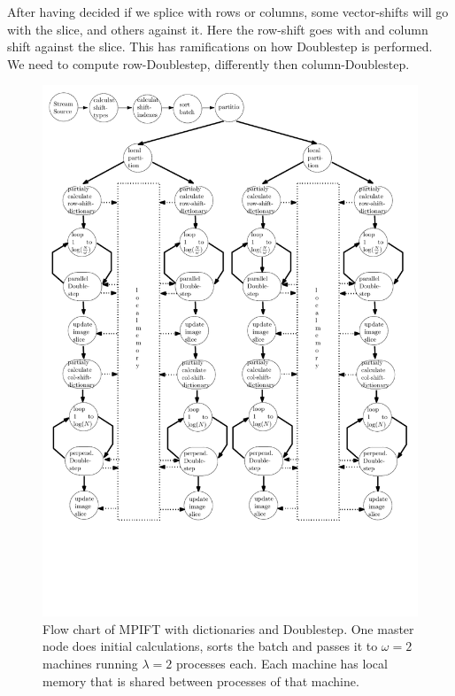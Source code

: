 \documentclass[12pt]{article}
\begin{document}
After having decided if we splice with rows or columns, some vector-shifts will go with the slice, and others against it. Here the row-shift goes with and column shift against the slice. This has ramifications on how Doublestep is performed. We need to compute row-Doublestep, differently then column-Doublestep. \\

\begin{figure}[H]
	\begin{center}
	\includegraphics[width=370pt]{DOUBLESTEP_plan}
\end{center}
	\caption{Flow chart of MPIFT with dictionaries and Doublestep. One master node does initial calculations, sorts the batch and passes it to $\omega=2$ machines running $\lambda=2$ processes each. Each machine has local memory that is shared between processes of that machine.}
	\label{fig::doublestep_plan}
\end{figure}
\end{document}
